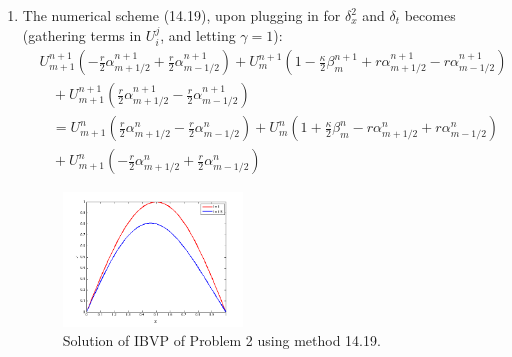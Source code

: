 \documentclass[11pt]{article}
\def\f{\frac }
\begin{document}
\begin{enumerate}
\clearpage
\pagebreak
\item The numerical scheme (14.19), upon plugging in for $\delta _x ^2$ and $\delta _t$ becomes (gathering terms in $U_i ^j$, and letting $\gamma = 1$):
\begin{align*} &U_{m+1} ^{n+1} \left ( -\f{r}{2} \alpha _{m+1/2} ^{n+1} +\f{r}{2} \alpha _{m-1/2} ^{n+1} \right ) + U_{m} ^{n+1} \left ( 1 - \f{\kappa}{2} \beta _{m} ^{n+1} +r \alpha _{m+1/2} ^{n+1} -r \alpha _{m-1/2} ^{n+1} \right )\\
&~~~~ + U_{m+1} ^{n+1} \left ( \f{r}{2} \alpha _{m+1/2} ^{n+1} -\f{r}{2} \alpha _{m-1/2} ^{n+1} \right )\\
&~~~~ = U_{m+1} ^{n} \left ( \f{r}{2} \alpha _{m+1/2} ^{n} -\f{r}{2} \alpha _{m-1/2} ^{n} \right ) + U_{m} ^{n} \left ( 1 + \f{\kappa}{2} \beta _{m} ^{n} -r \alpha _{m+1/2} ^{n} +r \alpha _{m-1/2} ^{n} \right )\\
&~~~~ + U_{m+1} ^{n} \left ( - \f{r}{2} \alpha _{m+1/2} ^{n} +\f{r}{2} \alpha _{m-1/2} ^{n} \right )\end{align*}



\begin{figure}[h!]
  \centering
    \includegraphics[width=0.45\textwidth]{andy_hw14_prb02_01.png}
  \caption{Solution of IBVP of Problem 2 using method 14.19.}
\end{figure}


\end{enumerate}
\end{document}
